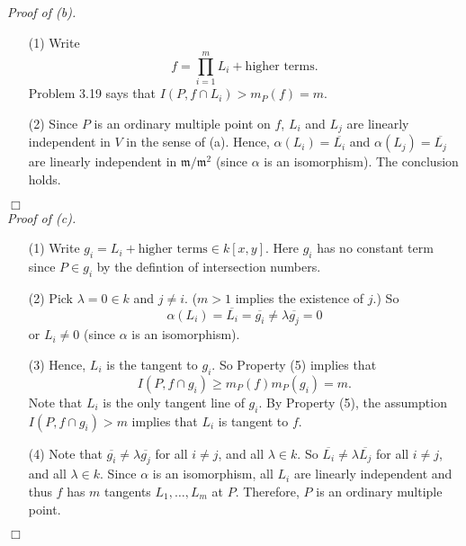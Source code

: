 \documentclass{article}
\begin{document}
\emph{Proof of (b).}
\begin{enumerate}
\item[(1)]
  Write
  \[
    f = \prod_{i=1}^{m} L_i + \text{higher terms}.
  \]
  Problem 3.19 says that $I(P, f \cap L_i) > m_P(f) = m$.

\item[(2)]
  Since $P$ is an ordinary multiple point on $f$,
  $L_i$ and $L_j$ are linearly independent in $V$ in the sense of (a).
  Hence, $\alpha(L_i) = \overline{L_i}$ and $\alpha(L_j) = \overline{L_j}$
  are linearly independent in $\mathfrak{m}/\mathfrak{m}^2$
  (since $\alpha$ is an isomorphism).
  The conclusion holds.
\end{enumerate}
$\Box$ \\



\emph{Proof of (c).}
\begin{enumerate}
\item[(1)]
  Write $g_i = L_i + \text{higher terms} \in k[x,y]$.
  Here $g_i$ has no constant term since $P \in g_i$ by the defintion of intersection numbers.

\item[(2)]
  Pick $\lambda = 0 \in k$ and $j \neq i$.
  ($m > 1$ implies the existence of $j$.)
  So
  \[
    \alpha(L_i) = \overline{L_i} = \overline{g_i} \neq \lambda \overline{g_j} = 0
  \]
  or $L_i \neq 0$ (since $\alpha$ is an isomorphism).

\item[(3)]
  Hence, $L_i$ is the tangent to $g_i$.
  So Property (5) implies that
  \[
    I(P, f \cap g_i)
    \geq m_P(f) m_P(g_i)
    = m.
  \]
  Note that $L_i$ is the only tangent line of $g_i$.
  By Property (5),
  the assumption $I(P, f \cap g_i) > m$ implies that $L_i$ is tangent to $f$.

\item[(4)]
  Note that
  $\overline{g_i} \neq \lambda \overline{g_j}$ for all $i \neq j$, and all $\lambda \in k$.
  So $\overline{L_i} \neq \lambda \overline{L_j}$ for all $i \neq j$, and all $\lambda \in k$.
  Since $\alpha$ is an isomorphism, all $L_i$ are linearly independent
  and thus $f$ has $m$ tangents $L_1, \ldots, L_m$ at $P$.
  Therefore, $P$ is an ordinary multiple point.
\end{enumerate}
$\Box$ \\
\end{document}
